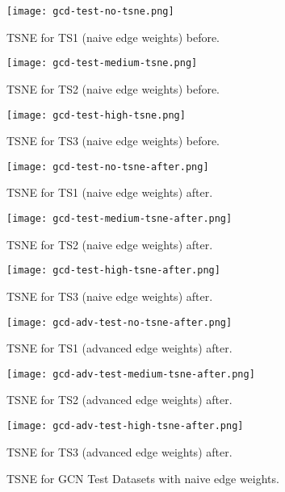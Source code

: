 \begin{figure}[htb]
  \centering
  \begin{minipage}{0.32\textwidth}
    \centering
    \texttt{[image: gcd-test-no-tsne.png]}
    \caption{TSNE for TS1 (naive edge weights) before.}
  \end{minipage}
  \begin{minipage}{0.32\textwidth}
    \centering
    \texttt{[image: gcd-test-medium-tsne.png]}
    \caption{TSNE for TS2 (naive edge weights) before.}
  \end{minipage}
  \begin{minipage}{0.32\textwidth}
    \centering
    \texttt{[image: gcd-test-high-tsne.png]}
    \caption{TSNE for TS3 (naive edge weights) before.}
  \end{minipage}
  \begin{minipage}{0.32\textwidth}
    \centering
    \texttt{[image: gcd-test-no-tsne-after.png]}
    \caption{TSNE for TS1 (naive edge weights) after.}
  \end{minipage}
  \begin{minipage}{0.32\textwidth}
    \centering
    \texttt{[image: gcd-test-medium-tsne-after.png]}
    \caption{TSNE for TS2 (naive edge weights) after.}
  \end{minipage}
  \begin{minipage}{0.32\textwidth}
    \centering
    \texttt{[image: gcd-test-high-tsne-after.png]}
    \caption{TSNE for TS3 (naive edge weights) after.}
  \end{minipage}
  \begin{minipage}{0.32\textwidth}
    \centering
    \texttt{[image: gcd-adv-test-no-tsne-after.png]}
    \caption{TSNE for TS1 (advanced edge weights) after.}
  \end{minipage}
  \begin{minipage}{0.32\textwidth}
    \centering
    \texttt{[image: gcd-adv-test-medium-tsne-after.png]}
    \caption{TSNE for TS2 (advanced edge weights) after.}
  \end{minipage}
  \begin{minipage}{0.32\textwidth}
    \centering
    \texttt{[image: gcd-adv-test-high-tsne-after.png]}
    \caption{TSNE for TS3 (advanced edge weights) after.}
  \end{minipage}
  \caption{TSNE for GCN Test Datasets with naive edge weights.}
  \label{fig:gcn-test-tsne}
\end{figure}

